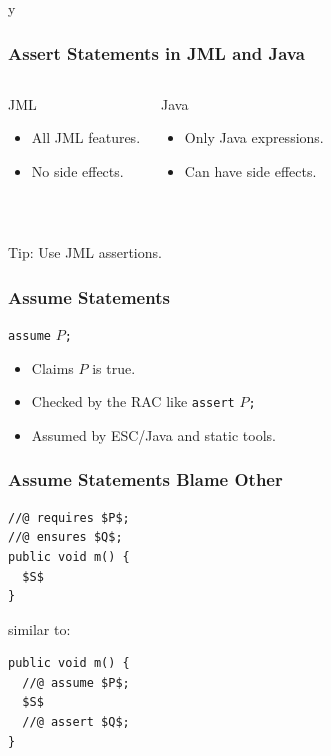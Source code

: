 \if y\MAKEHANDOUTS \documentclass[compress,landscape,handout]{beamer}
\begin{document}
\begin{frame}
\frametitle{Assert Statements in JML and Java}

\begin{columns}[t]
\begin{block}{JML}
\begin{itemize}
\item
All JML features.

\item
No side effects.
\end{itemize}
\end{block}

\begin{block}{Java}
\begin{itemize}
\item
Only Java expressions.

\item
Can have side effects.
\end{itemize}
\end{block}
\end{columns}

~

Tip: Use JML assertions.

\end{frame}

\begin{frame}[fragile]
\frametitle{Assume Statements}

\lstinline!assume! $P$\texttt{;}

\begin{itemize}
\item
Claims $P$ is true.

\item
Checked by the RAC like \lstinline!assert! $P$\texttt{;}

\item
Assumed by ESC/Java and static tools.
\end{itemize}

\end{frame}

\begin{frame}[fragile]
\frametitle{Assume Statements Blame Other}

\begin{lstlisting}[mathescape=true]
//@ requires $P$;
//@ ensures $Q$;
public void m() {
  $S$
}
\end{lstlisting}

similar to:

\begin{lstlisting}[mathescape=true]
public void m() {
  //@ assume $P$;
  $S$
  //@ assert $Q$;
}
\end{lstlisting}
\end{frame}
\end{document}
